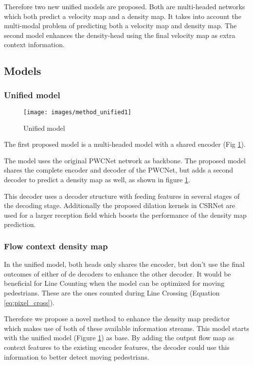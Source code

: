 Therefore two new unified models are proposed. Both are multi-headed networks which both predict a velocity map and a density map. It takes into account the multi-modal problem of predicting both a velocity map and density map. The second model enhances the density-head using the final velocity map as extra context information.


\subsection{Models}
\subsubsection{Unified model}
\begin{figure}[h]
\centering
\texttt{[image: images/method\_unified1]}
\caption{Unified model}
\label{fig:unified_model}
\end{figure}
The first proposed model is a multi-headed model with a shared encoder (Fig \ref{fig:unified_model}).

The model uses the original PWCNet network \cite{sun_pwc-net_2018} as backbone. The proposed model shares the complete encoder and decoder of the PWCNet, but adds a second decoder to predict a density map as well, as shown in figure \ref{fig:unified_model}.

This decoder uses a decoder structure with feeding features in several stages of the decoding stage. Additionally the proposed dilation kernels in CSRNet\cite{li2018csrnet} are used for a larger reception field which boosts the performance of the density map prediction.

\subsubsection{Flow context density map}
In the unified model, both heads only shares the encoder, but don't use the final outcomes of either of de decoders to enhance the other decoder. It would be beneficial for Line Counting when the model can be optimized for moving pedestrians. These are the ones counted during Line Crossing (Equation \ref{eq:pixel_cross}).

Therefore we propose a novel method to enhance the density map predictor which makes use of both of these available information streams. This model starts with the unified model (Figure \ref{fig:unified_model}) as base. By adding the output flow map as context features to the existing encoder features, the decoder could use this information to better detect moving pedestrians.

